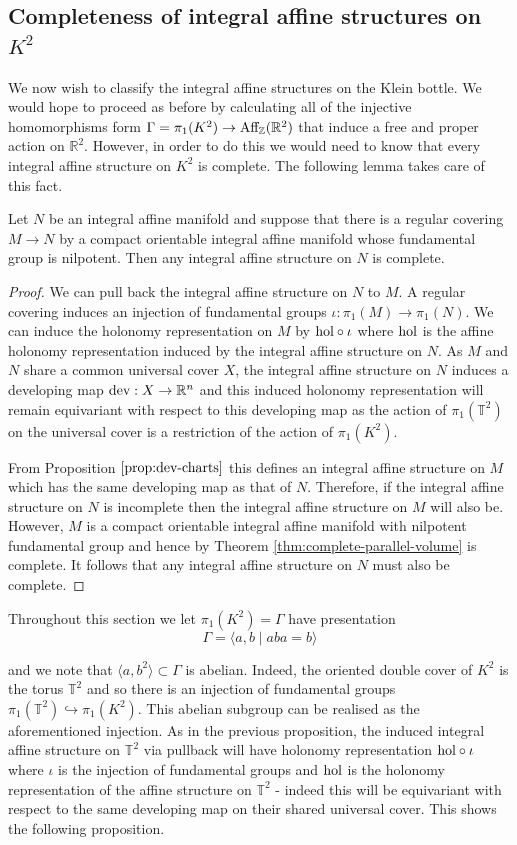 \subsection{Completeness of integral affine structures on $K^2$}
We now wish to classify the integral affine structures on the Klein bottle. We
would hope to proceed as before by calculating all of the injective
homomorphisms form $\Gamma = \pi_1(K^2) \to \text{Aff}_{\mathbb{Z}}(\mathbb{R}^2)$ that induce a free and
proper action on $\mathbb{R}^2$. However, in order to do this we would need to
know that every integral affine structure on $K^2$ is complete. The following
lemma takes care of this fact.

\begin{lemma}
    Let $N$ be an integral affine manifold and suppose that there is a regular covering $M \to N$ by a compact orientable integral affine manifold whose fundamental group is nilpotent. Then any integral affine structure on $N$ is complete.
\end{lemma}
\begin{proof}
    We can pull back the integral affine structure on $N$ to $M$. A regular covering induces an injection of fundamental groups $\iota: \pi_1(M) \to \pi_1(N)$. We can induce the holonomy representation on $M$ by $\text{hol} \circ \iota$ where $\text{hol}$ is the affine holonomy representation induced by the
    integral affine structure on $N$. As $M$ and $N$ share a common universal cover $X$, the integral affine structure on $N$ induces a developing map $\text{dev} : X \to \mathbb{R}^n$ and this induced holonomy representation will remain equivariant with respect to this developing map as the action of $\pi_1(\mathbb{T}^2)$ on the universal cover is a restriction of the action of $\pi_1(K^2)$.

    From Proposition $\ref{prop:dev-charts}$ this defines an integral affine
    structure on $M$ which has the same developing map as that of $N$. Therefore,
    if the integral affine structure on $N$ is incomplete then the integral affine
    structure on $M$ will also be. However, $M$ is a compact orientable integral
    affine manifold with nilpotent fundamental group and hence by Theorem
    \ref{thm:complete-parallel-volume} is complete. It follows that any integral
    affine structure on $N$ must also be complete.
\end{proof}

Throughout this section we let $\pi_1(K^2) = \Gamma$ have presentation $$\Gamma
    = \langle a,b \mid aba = b \rangle$$

and we note that $\langle a,b^2 \rangle \subset \Gamma$ is abelian. Indeed, the
oriented double cover of $K^2$ is the torus $\mathbb{T}^2$ and so there is an
injection of fundamental groups $\pi_1(\mathbb{T}^2) \hookrightarrow
    \pi_1(K^2)$. This abelian subgroup can be realised as the aforementioned
injection. As in the previous proposition, the induced integral affine
structure on $\mathbb{T}^2$ via pullback will have holonomy representation
$\text{hol} \circ \iota$ where $\iota$ is the injection of fundamental groups and
$\text{hol}$ is the holonomy representation of the affine structure on $\mathbb{T}^2$
- indeed this will be equivariant with respect to the same developing map on
their shared universal cover. This shows the following proposition.

